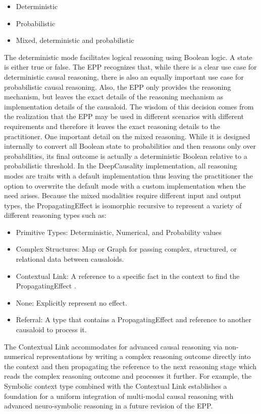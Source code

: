 \begin{itemize}	
	\item Deterministic
	\item Probabilistic 
	\item Mixed, deterministic and probabilistic 
\end{itemize}

The deterministic mode facilitates logical reasoning using Boolean logic. A state is either true or false. The EPP recognizes that, while there is a clear use case for deterministic causal reasoning, there is also an equally important use case for probabilistic causal reasoning. Also, the EPP only provides the reasoning mechanism, but leaves the exact details of the reasoning mechanism as implementation details of the causaloid. The wisdom of this decision comes from the realization that the EPP may be used in different scenarios with different requirements and therefore it leaves the exact reasoning details to the practitioner. One important detail on the mixed reasoning. While it is designed internally to convert all Boolean state to probabilities and then reasons only over  probabilities, its final outcome is actually a deterministic Boolean relative to a probabilistic threshold. In the DeepCausality implementation, all reasoning modes are traits with a default implementation thus leaving the practitioner the option to overwrite the default mode with a custom implementation when the need arises. Because the mixed modalities require different input and output types, the PropagatingEffect is isomorphic recursive to represent a variety of different reasoning types such as:

\begin{itemize}	
	\item Primitive Types: Deterministic, Numerical, and Probability values
	\item Complex Structures: Map or Graph for passing complex, structured, or relational data between causaloids.
	\item Contextual Link: A reference to a specific fact in the context to find the PropagatingEffect . 
	\item None: Explicitly represent no effect.
	\item Referral: A type that contains a PropagatingEffect and reference to another causaloid to process it.
\end{itemize}

The Contextual Link accommodates for advanced causal reasoning via non-numerical representations by writing a complex reasoning outcome directly into the context and then propagating the reference to the next reasoning stage which reads the complex reasoning outcome and processes it further. For example, the Symbolic context type combined with the Contextual Link establishes a foundation for a uniform integration of multi-modal causal reasoning with advanced neuro-symbolic reasoning in a future revision of the EPP.

